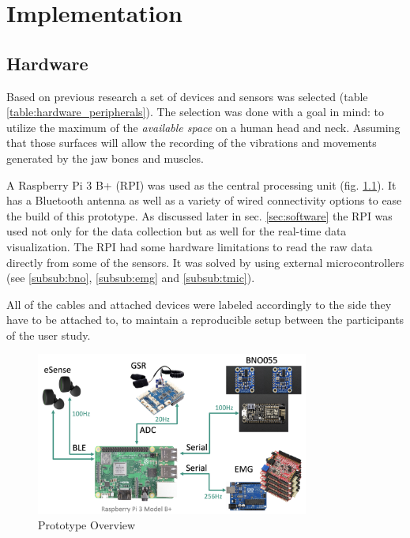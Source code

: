 \newcommand{\usedspecs}[5]{
\begin{table}[h!]
\centering
\begin{tabular}{|c||c|} 
 \hline
 Interface & #1 \\
 \hline
 Sample rate & #2 \\ 
 \hline
 Data & #3 \\ 
 \hline
\end{tabular}
\caption{#4. Used technical specifications}
\label{table:#5_specs}
\end{table}
}

\chapter{Implementation}
\label{ch:Implementation}

\section{Hardware}
\label{sec:hardware}

Based on previous research a set of devices and sensors was selected (table \ref{table:hardware_peripherals}). The selection was done with a goal in mind: to utilize the maximum of the \emph{available space} on a human head and neck. Assuming that those surfaces will allow the recording of the vibrations and movements generated by the jaw bones and muscles. 

A Raspberry Pi 3 B+ (RPI) was used as the central processing unit (fig. \ref{image:prototype_overview}). It has a Bluetooth antenna as well as a variety of wired connectivity options to ease the build of this prototype. As discussed later in sec. \ref{sec:software} the RPI was used not only for the data collection but as well for the real-time data visualization. The RPI had some hardware limitations to read the raw data directly from some of the sensors. It was solved by using external microcontrollers (see \ref{subsub:bno}, \ref{subsub:emg} and \ref{subsub:tmic}).

All of the cables and attached devices were labeled accordingly to the side they have to be attached to, to maintain a reproducible setup between the participants of the user study.

\begin{figure}[h]
\centering
\includegraphics[width=0.8\textwidth]{src/media/hardware/overview.png}
\caption{Prototype Overview}
\label{image:prototype_overview}
\end{figure}

